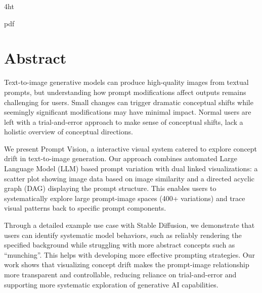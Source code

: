 \documentclass[
  a4paper,  %
  twoside,  %
  bibliography=totoc,
  headsepline,
  cleardoublepage=empty,
  parskip=half,
  draft=false
]{scrbook}
\begin{document}
\iftex4ht
  \Configure{$}{\PicMath}{\EndPicMath}{}

  {pdf}
  {%
  }
\fi



\Titelblatt

\pagestyle{preamble}
\renewcommand*{\chapterpagestyle}{preamble}



\section*{Abstract}

	Text-to-image generative models can produce high-quality images from textual prompts, but understanding how prompt modifications affect outputs remains challenging for users. Small changes can trigger dramatic conceptual shifts while seemingly significant modifications may have minimal impact. Normal users are left with a trial-and-error approach to make sense of conceptual shifts, lack a holistic overview of conceptual directions. 
	
	We present Prompt Vision, a interactive visual system catered to explore concept drift in text-to-image generation. Our approach combines automated Large Language Model (LLM) based prompt variation with dual linked visualizations: a scatter plot showing image data based on image similarity and a directed acyclic graph (DAG) displaying the prompt structure. This enables users to systematically explore large prompt-image spaces (400+ variations) and trace visual patterns back to specific prompt components.
	
	Through a detailed example use case with Stable Diffusion, we demonstrate that users can identify systematic model behaviors, such as reliably rendering the specified background while struggling with more abstract concepts such as \enquote{munching}. This helps with developing more effective prompting strategies. Our work shows that visualizing concept drift makes the prompt-image relationship more transparent and controllable, reducing reliance on trial-and-error and supporting more systematic exploration of generative AI capabilities.
\end{document}
